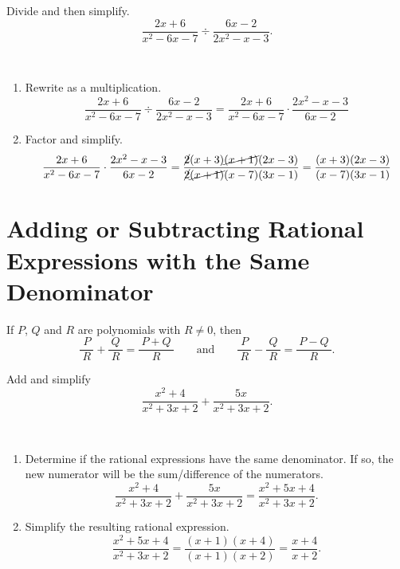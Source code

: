 \documentclass[
  en,11pt]{elegantbook}
\let\BeginKnitrBlock\begin \let\EndKnitrBlock\end
\begin{document}
\BeginKnitrBlock{example}
\protect\hypertarget{exm:unnamed-chunk-41}{}{\label{exm:unnamed-chunk-41} }
Divide and then simplify.\\
\[
\dfrac{2x+6}{x^2-6x-7}\div \dfrac{6x-2}{2x^2-x-3}.
\]
\EndKnitrBlock{example}

\BeginKnitrBlock{solution}
{}\\

\begin{enumerate}
\def\labelenumi{\arabic{enumi}.}

\item
  Rewrite as a multiplication.\\
  \[
  \dfrac{2x+6}{x^2-6x-7}\div \dfrac{6x-2}{2x^2-x-3}=\dfrac{2x+6}{x^2-6x-7}\cdot \dfrac{2x^2-x-3}{6x-2}
  \]
\item
  Factor and simplify.\\
  \[
  \dfrac{2x+6}{x^2-6x-7}\cdot\dfrac{2x^2-x-3}{6x-2}
  =\dfrac{\cancel{2}(x+3)\cancel{(x+1)}(2x-3)}{\cancel{2}\cancel{(x+1)}(x-7)(3x-1)}
  =\dfrac{(x+3)(2x-3)}{(x-7)(3x-1)}
  \]
\end{enumerate}
\EndKnitrBlock{solution}

\hypertarget{adding-or-subtracting-rational-expressions-with-the-same-denominator}{%
\section{Adding or Subtracting Rational Expressions with the Same Denominator}\label{adding-or-subtracting-rational-expressions-with-the-same-denominator}}

If \(P\), \(Q\) and \(R\) are polynomials with \(R\neq 0\), then
\[
\dfrac{~P~}{~R~}+\dfrac{~Q~}{~R~}=\dfrac{~P+Q~}{~R~}\qquad \text{and} \qquad
\dfrac{~P~}{~R~}-\dfrac{~Q~}{~R~}=\dfrac{~P-Q~}{~R~}.
\]

\BeginKnitrBlock{example}
\protect\hypertarget{exm:unnamed-chunk-43}{}{\label{exm:unnamed-chunk-43} }
Add and simplify\\
\[
\dfrac{x^2+4}{x^2+3x+2}+\dfrac{5x}{x^2+3x+2}.
\]
\EndKnitrBlock{example}

\BeginKnitrBlock{solution}
{}\\

\begin{enumerate}
\def\labelenumi{\arabic{enumi}.}

\item
  Determine if the rational expressions have the same denominator. If so, the new numerator will be the sum/difference of the numerators.
  \[
   \dfrac{x^2+4}{x^2+3x+2}+\dfrac{5x}{x^2+3x+2}=\dfrac{x^2+5x+4}{x^2+3x+2}.
  \]
\item
  Simplify the resulting rational expression.
  \[
   \dfrac{x^2+5x+4}{x^2+3x+2}=\dfrac{(x+1)(x+4)}{(x+1)(x+2)}=\dfrac{x+4}{x+2}.
  \]
\end{enumerate}
\EndKnitrBlock{solution}
\end{document}
